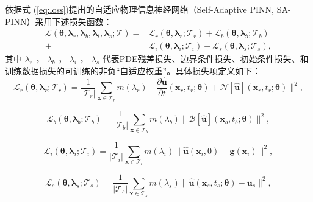 依据式 (\ref{eq:loss})提出的自适应物理信息神经网络（Self-Adaptive PINN, SA-PINN）采用下述损失函数：
\begin{equation}
    \label{eq:sa_loss}
    \begin{aligned}
        \mathcal{L}(\boldsymbol{\theta},\boldsymbol{\lambda}_r,\boldsymbol{\lambda}_b,\boldsymbol{\lambda}_i,\boldsymbol{\lambda}_s;\mathcal{T}) 
        =&\mathcal{L}_r(\boldsymbol{\theta},\boldsymbol{\lambda}_r;\mathcal{T}_r) 
        +\mathcal{L}_b(\boldsymbol{\theta},\boldsymbol{\lambda}_b;\mathcal{T}_b) \\
        +&\mathcal{L}_i(\boldsymbol{\theta},\boldsymbol{\lambda}_i;\mathcal{T}_i) 
        +\mathcal{L}_s(\boldsymbol{\theta},\boldsymbol{\lambda}_s;\mathcal{T}_s),
    \end{aligned}
\end{equation}
其中 $\lambda_r$ ， $\lambda_b$ ， $\lambda_i$ ， $\lambda_s$ 代表PDE残差损失、边界条件损失、初始条件损失、和训练数据损失的可训练的非负“自适应权重”。具体损失项定义如下：
\begin{equation}
    \mathcal{L}_r(\boldsymbol{\theta},\boldsymbol{\lambda}_r;\mathcal{T} _r)=\frac1{|\mathcal{T}_r|}\sum_{\boldsymbol{x}\in \mathcal{T}_r}m(\lambda_r)\|\frac{\partial \boldsymbol{\hat{u}}}{\partial t}(\boldsymbol{x}_r,t_r;\boldsymbol{\theta})+\mathcal{N}[\boldsymbol{\hat{u}}](\boldsymbol{x}_r,t_r;\boldsymbol{\theta})\|^2,
\end{equation}

\begin{equation}
    \mathcal{L}_b(\boldsymbol{\theta},\boldsymbol{\lambda}_b;\mathcal{T} _b)=\frac1{|\mathcal{T}_b|}\sum_{\boldsymbol{x}\in \mathcal{T}_b}m(\lambda_b)\|\mathcal{B}[\boldsymbol{\hat{u}}](\boldsymbol{x}_b,t_b;\boldsymbol{\theta})\|^2,
\end{equation}

\begin{equation}
    \mathcal{L}_i(\boldsymbol{\theta},\boldsymbol{\lambda}_i;\mathcal{T} _i)=\frac1{|\mathcal{T}_i|}\sum_{\boldsymbol{x}\in \mathcal{T}_i}m(\lambda_i)\|\boldsymbol{\hat{u}}(\boldsymbol{x}_i,0)-\boldsymbol{g}(\boldsymbol{x}_i)\|^2,
\end{equation}

\begin{equation}
    \mathcal{L}_s(\boldsymbol{\theta},\boldsymbol{\lambda}_s;\mathcal{T} _s)=\frac1{|\mathcal{T}_s|}\sum_{\boldsymbol{x}\in \mathcal{T}_s}m(\lambda_s)\|\hat{\boldsymbol{u}}(\boldsymbol{x}_s,t_s;\boldsymbol{\theta})-\boldsymbol{u}_s\|^2,
\end{equation}

